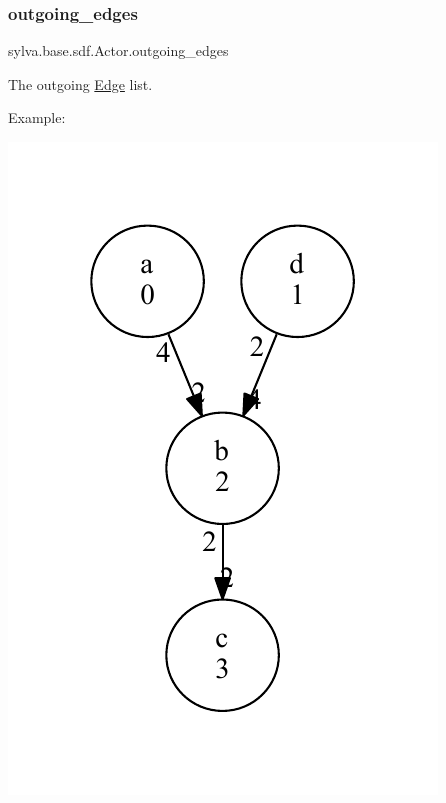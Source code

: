 \subsubsection{\texorpdfstring{outgoing\+\_\+edges}{outgoing\_edges}}
{\footnotesize\ttfamily sylva.\+base.\+sdf.\+Actor.\+outgoing\+\_\+edges}



The outgoing \hyperlink{classsylva_1_1base_1_1sdf_1_1_edge}{Edge} list. 

Example\+: 
\begin{DoxyImage}
\includegraphics[width=\textwidth,height=\textheight/2,keepaspectratio=true]{dot_SDFG_example}
\end{DoxyImage}
 
